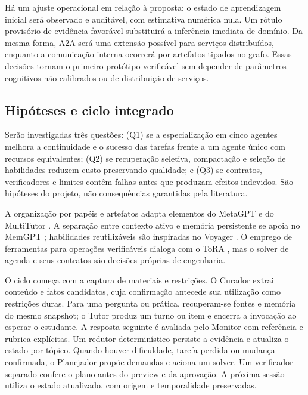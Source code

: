 \documentclass[12pt]{article}
\let\cite\citep
\begin{document}
Há um ajuste operacional em relação à proposta: o estado de aprendizagem inicial será observado e auditável, com estimativa numérica nula. Um rótulo provisório de evidência favorável substituirá a inferência imediata de domínio. Da mesma forma, A2A será uma extensão possível para serviços distribuídos, enquanto a comunicação interna ocorrerá por artefatos tipados no grafo. Essas decisões tornam o primeiro protótipo verificável sem depender de parâmetros cognitivos não calibrados ou de distribuição de serviços.

\subsection{Hipóteses e ciclo integrado}

Serão investigadas três questões: (Q1) se a especialização em cinco agentes melhora a continuidade e o sucesso das tarefas frente a um agente único com recursos equivalentes; (Q2) se recuperação seletiva, compactação e seleção de habilidades reduzem custo preservando qualidade; e (Q3) se contratos, verificadores e limites contêm falhas antes que produzam efeitos indevidos. São hipóteses do projeto, não consequências garantidas pela literatura.

A organização por papéis e artefatos adapta elementos do MetaGPT e do MultiTutor \cite{hong2024metagpt,sun2025multitutor}. A separação entre contexto ativo e memória persistente se apoia no MemGPT \cite{packer2023memgpt}; habilidades reutilizáveis são inspiradas no Voyager \cite{wang2023voyager}. O emprego de ferramentas para operações verificáveis dialoga com o ToRA \cite{gou2024tora}, mas o solver de agenda e seus contratos são decisões próprias de engenharia.

O ciclo começa com a captura de materiais e restrições. O Curador extrai conteúdo e fatos candidatos, cuja confirmação antecede sua utilização como restrições duras. Para uma pergunta ou prática, recuperam-se fontes e memória do mesmo snapshot; o Tutor produz um turno ou item e encerra a invocação ao esperar o estudante. A resposta seguinte é avaliada pelo Monitor com referência e rubrica explícitas. Um redutor determinístico persiste a evidência e atualiza o estado por tópico. Quando houver dificuldade, tarefa perdida ou mudança confirmada, o Planejador propõe demandas e aciona um solver. Um verificador separado confere o plano antes do preview e da aprovação. A próxima sessão utiliza o estado atualizado, com origem e temporalidade preservadas.
\end{document}
